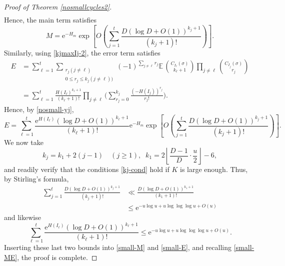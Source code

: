 \documentclass[10pt]{article}
\newcommand{\er}{\mathrm{e}}
\newcommand{\E}{{\mathbb E}\,}
\newcommand{\be}{\begin{equation}}
\newcommand{\ee}{\end{equation}}
\newcommand{\ssum}[1]{\sum_{\substack{#1}}}
\renewcommand{\le}{\leqslant}
\renewcommand{\ge}{\geqslant}
\newcommand{\fl}[1]{{\ensuremath{\left\lfloor {#1} \right\rfloor}}}
\renewcommand{\(}{\left(}
\renewcommand{\)}{\right)}
\begin{document}
\begin{proof}[Proof of Theorem \ref{nosmallcycles2}]
\begin{align}
\label{nosmall-yj}
\end{align}
Hence, the main term satisfies
\be\label{small-M}
M = \er^{-H_m} \exp\left[ O\(\sum_{j=1}^t \frac{D(\log D+O(1))^{k_j+1}}{(k_j+1)!}\) \right].
\ee
Similarly, using \eqref{kjmaxIj-2},  the error term satisfies
\begin{align*}
E &=  \sum_{\ell=1}^t \ssum{r_j (j\ne \ell) \\ 0\le r_j\le k_j (j\ne \ell))} 
(-1)^{\sum_{j\ne \ell} r_j} \E \binom{C_{I_\ell}(\sigma)}{k_\ell+1} 
\prod_{j\ne \ell} \binom{C_{I_j}(\sigma)}{r_j} \\
&=  \sum_{\ell=1}^t
 \frac{H(I_\ell)^{k_\ell+1}}{(k_\ell+1)!} \prod_{j\ne \ell}
\Bigg( \sum_{r_j=0}^{k_j} \frac{(-H(I_j))^{r_j}}{r_j!}  \Bigg) .
\end{align*}
Hence, by \eqref{nosmall-yj},
\be\label{small-E}
E=\sum_{\ell=1}^t \frac{\er^{H(I_\ell)}(\log D+O(1))^{k_\ell+1}}
{(k_\ell+1)!} \er^{-H_m} \exp\left[ O\(\sum_{j=1}^t \frac{D(\log D+O(1))^{k_j+1}}{(k_j+1)!}\) \right].
\ee
We now take
\[
k_j=k_1+2(j-1) \quad (j\ge 1), \;\; k_1=2\fl{\frac{D-1}{D} \cdot \frac{u}{2}}-6,
\]
and readily verify that the conditions \eqref{kj-cond} hold if
$K$ is large enough.
Thus, by Stirling's formula,
\begin{align*}
\sum_{j=1}^t \frac{D(\log D+O(1))^{k_j+1}}{(k_j+1)!} 
&\ll \frac{D(\log D+O(1))^{k_1+1}}{(k_1+1)!} \\
&\le \er^{-u\log u + u\log\log\log u + O(u)}
\end{align*}
and likewise
\[
\sum_{\ell=1}^t \frac{\er^{H(I_\ell)}(\log D+O(1))^{k_\ell+1}}
{(k_\ell+1)!} \le  \er^{-u\log u + u\log\log\log u + O(u)}.
\]
Inserting these last two bounds into 
\eqref{small-M} and \eqref{small-E}, and recalling \eqref{small-ME},
the proof is complete.
\end{proof}
\end{document}
